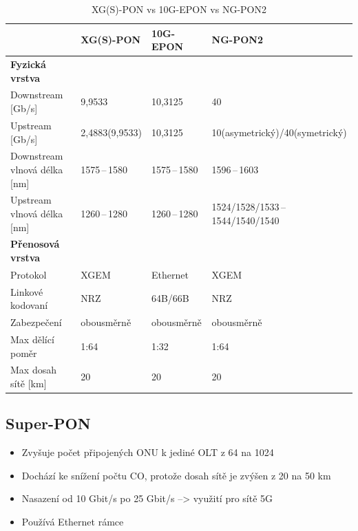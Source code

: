 \begin{table}[ht]
    \centering
    \caption{XG(S)-PON vs 10G-EPON vs NG-PON2}
    \begin{tabular}{|l|l|l|l|}
        \hline
                                     & XG(S)-PON      & 10G-EPON       & NG-PON2                            \\\hline\hline
        \textbf{Fyzická vrstva}      &                &                &                                    \\\hline\hline
        Downstream [Gb/s]            & 9,9533         & 10,3125        & 40                                 \\\hline
        Upstream [Gb/s]              & 2,4883(9,9533) & 10,3125        & 10(asymetrický)/40(symetrický)     \\\hline
        Downstream vlnová délka [nm] & 1575\,--\,1580 & 1575\,--\,1580 & 1596\,--\,1603                     \\\hline
        Upstream vlnová délka [nm]   & 1260\,--\,1280 & 1260\,--\,1280 & 1524/1528/1533\,--\,1544/1540/1540 \\\hline\hline
        \textbf{Přenosová vrstva}    &                &                &                                    \\\hline\hline
        Protokol                     & XGEM           & Ethernet       & XGEM                               \\\hline
        Linkové kodovaní             & NRZ            & 64B/66B        & NRZ                                \\\hline
        Zabezpečení                  & obousměrně     & obousměrně     & obousměrně                         \\\hline
        Max dělící poměr             & 1:64           & 1:32           & 1:64                               \\\hline
        Max dosah sítě [km]          & 20             & 20             & 20                                 \\\hline
    \end{tabular}
\end{table}

\subsection{Super-PON}
\begin{itemize}
    \item Zvyšuje počet připojených ONU k jediné OLT z 64 na 1024
    \item Dochází ke snížení počtu CO, protože dosah sítě je zvýšen z 20 na 50 km
    \item Nasazení od 10 Gbit/s po 25 Gbit/s --> využití pro sítě 5G
    \item Používá Ethernet rámce
\end{itemize}

